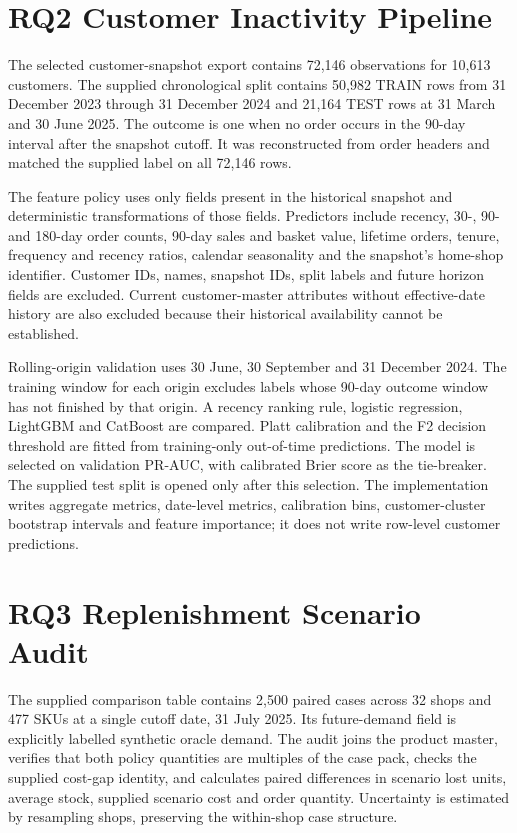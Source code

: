 \section{RQ2 Customer Inactivity Pipeline}

The selected customer-snapshot export contains 72,146 observations for
10,613 customers. The supplied chronological split contains 50,982 TRAIN
rows from 31 December 2023 through 31 December 2024 and 21,164 TEST rows
at 31 March and 30 June 2025. The outcome is one when no order occurs in
the 90-day interval after the snapshot cutoff. It was reconstructed from
order headers and matched the supplied label on all 72,146 rows.

The feature policy uses only fields present in the historical snapshot and
deterministic transformations of those fields. Predictors include recency,
30-, 90- and 180-day order counts, 90-day sales and basket value, lifetime
orders, tenure, frequency and recency ratios, calendar seasonality and the
snapshot's home-shop identifier. Customer IDs, names, snapshot IDs, split
labels and future horizon fields are excluded. Current customer-master
attributes without effective-date history are also excluded because their
historical availability cannot be established.

Rolling-origin validation uses 30 June, 30 September and 31 December 2024.
The training window for each origin excludes labels whose 90-day outcome
window has not finished by that origin. A recency ranking rule, logistic
regression, LightGBM and CatBoost are compared. Platt calibration and the
F2 decision threshold are fitted from training-only out-of-time predictions.
The model is selected on validation PR-AUC, with calibrated Brier score as
the tie-breaker. The supplied test split is opened only after this selection.
The implementation writes aggregate metrics, date-level metrics,
calibration bins, customer-cluster bootstrap intervals and feature
importance; it does not write row-level customer predictions.

\section{RQ3 Replenishment Scenario Audit}

The supplied comparison table contains 2,500 paired cases across 32 shops
and 477 SKUs at a single cutoff date, 31 July 2025. Its future-demand field
is explicitly labelled synthetic oracle demand. The audit joins the product
master, verifies that both policy quantities are multiples of the case pack,
checks the supplied cost-gap identity, and calculates paired differences
in scenario lost units, average stock, supplied scenario cost and order
quantity. Uncertainty is estimated by resampling shops, preserving the
within-shop case structure.

